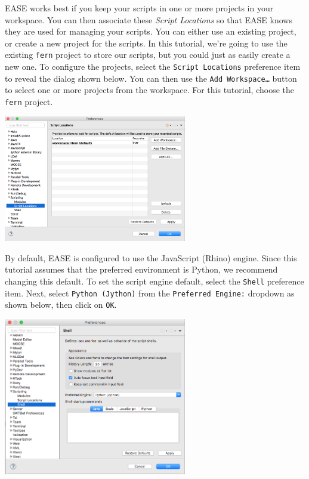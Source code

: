 EASE works best if you keep your scripts in one or more projects in
your workspace. You can then associate these \emph{Script Locations} so
that EASE knows they are used for managing your scripts. You can either use an
existing project, or create a new project for the scripts. In this tutorial,
we're going to use the existing \texttt{fern} project to store our scripts, but
you could just as easily create a new one. To configure the projects, select the
\texttt{Script Locations} preference item to reveal the dialog shown below.
You can then use the \texttt{Add Workspace\ldots} button to
select one or more projects from the workspace. For this tutorial, choose the
\texttt{fern} project.

\begin{center} \includegraphics[width=8cm]{images/scripting-prefs1}
\end{center}

By default, EASE is configured to use the JavaScript (Rhino) engine.
Since this tutorial assumes that the preferred environment is Python, we recommend changing
this default. To set the script engine default, select the
\texttt{Shell} preference item. Next, select \texttt{Python (Jython)} from
the \texttt{Preferred Engine:} dropdown as shown below,
then click on \texttt{OK}.

\begin{center} \includegraphics[width=8cm]{images/scripting-prefs2}
\end{center}


